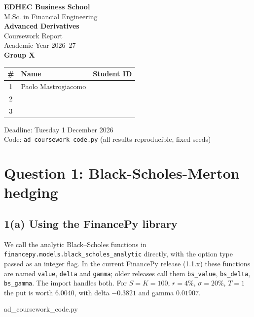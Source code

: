 \documentclass[11pt,a4paper]{article}
\newcommand{\code}[2]{%
  
  {ad_coursework_code.py}}
\begin{document}
\begin{titlepage}
\centering
\vspace*{1.5cm}

{\Large\bfseries EDHEC Business School}\\[3mm]
{\large M.Sc. in Financial Engineering}\\[18mm]

{\LARGE\bfseries Advanced Derivatives}\\[5mm]
{\LARGE Coursework Report}\\[6mm]
{\Large Academic Year 2026--27}\\[18mm]

{\Large\bfseries Group X}\\[10mm]

\begin{tabular}{@{}cll@{}}
\toprule
\# & Name & Student ID\\
\midrule
1 & Paolo Mastrogiacomo\hspace{2.5cm} & \hspace{3cm}\\
2 & \hspace{7cm} & \hspace{3cm}\\
3 & \hspace{7cm} & \hspace{3cm}\\
\bottomrule
\end{tabular}

\vfill
{\large Deadline: Tuesday 1 December 2026}\\[3mm]
{\normalsize Code: \texttt{ad\_coursework\_code.py} (all results reproducible,
fixed seeds)}
\vspace*{1.5cm}
\end{titlepage}

\section*{Question 1: Black-Scholes-Merton hedging}

\subsection*{1(a) Using the FinancePy library}
We call the analytic Black--Scholes functions in
\texttt{financepy.models.black\_scholes\_analytic} directly, with the option
type passed as an integer flag. In the current FinancePy release (1.1.x) these
functions are named \texttt{value}, \texttt{delta} and \texttt{gamma}; older
releases call them \texttt{bs\_value}, \texttt{bs\_delta},
\texttt{bs\_gamma}. The import handles both. For $S=K=100$, $r=4\%$,
$\sigma=20\%$, $T=1$ the put is worth $6.0040$, with delta $-0.3821$ and
gamma $0.01907$.
\code{imports}{Direct calls into the FinancePy model library.}
\end{document}

